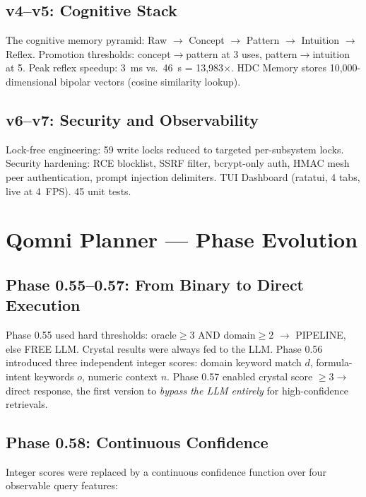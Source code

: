 \documentclass[12pt,a4paper]{article}
\begin{document}
\subsection{v4--v5: Cognitive Stack}

The cognitive memory pyramid: Raw $\to$ Concept $\to$ Pattern $\to$ Intuition
$\to$ Reflex. Promotion thresholds: concept$\to$pattern at 3 uses,
pattern$\to$intuition at 5. Peak reflex speedup: 3~ms vs.\ 46~s = 13,983$\times$.
HDC Memory stores 10,000-dimensional bipolar vectors (cosine similarity lookup).

\subsection{v6--v7: Security and Observability}

Lock-free engineering: 59 write locks reduced to targeted per-subsystem locks.
Security hardening: RCE blocklist, SSRF filter, bcrypt-only auth, HMAC mesh
peer authentication, prompt injection delimiters. TUI Dashboard (ratatui,
4 tabs, live at 4~FPS). 45 unit tests.

\section{Qomni Planner --- Phase Evolution}
\label{sec:planner}

\subsection{Phase 0.55--0.57: From Binary to Direct Execution}

Phase 0.55 used hard thresholds: oracle$\geq$3 AND domain$\geq$2 $\to$ PIPELINE,
else FREE LLM. Crystal results were always fed to the LLM.
Phase 0.56 introduced three independent integer scores: domain keyword match
$d$, formula-intent keywords $o$, numeric context $n$.
Phase 0.57 enabled crystal score $\geq3 \to$ direct response, the first version
to \emph{bypass the LLM entirely} for high-confidence retrievals.

\subsection{Phase 0.58: Continuous Confidence}

Integer scores were replaced by a continuous confidence function over four
observable query features:
\end{document}
